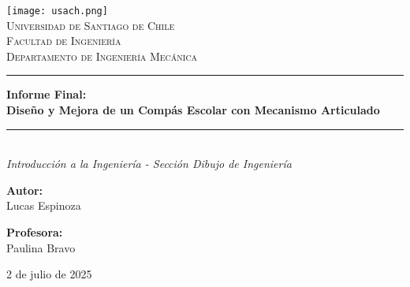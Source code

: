 \documentclass[11pt, a4paper]{article}
\begin{document}
\begin{titlepage}
    \centering
    \texttt{[image: usach.png]}\\[2cm] 
    \textsc{\LARGE Universidad de Santiago de Chile}\\[0.5cm]
    \textsc{\Large Facultad de Ingeniería}\\[0.5cm]
    \textsc{\Large Departamento de Ingeniería Mecánica}\\[2.5cm]
    
    \rule{\textwidth}{1.5pt}\vspace{0.4cm}
    {\Huge \bfseries Informe Final: \\[0.5cm] Diseño y Mejora de un Compás Escolar con Mecanismo Articulado}\\[0.4cm]
    \rule{\textwidth}{1.5pt}\\[1.5cm]
    
    {\Large \textit{Introducción a la Ingeniería - Sección Dibujo de Ingeniería}}\\[2cm]
    
    \begin{minipage}{0.45\textwidth}
        \begin{flushleft} \large
            \textbf{Autor:}\\
            Lucas Espinoza
        \end{flushleft}
    \end{minipage}
    \hfill
    \begin{minipage}{0.45\textwidth}
        \begin{flushright} \large
            \textbf{Profesora:}\\
            Paulina Bravo
        \end{flushright}
    \end{minipage}

    \vfill
    
    {\large 2 de julio de 2025}
\end{titlepage}
\end{document}

